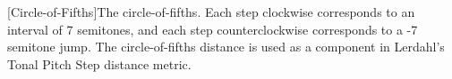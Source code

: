 [Circle-of-Fifths]The circle-of-fifths. Each step clockwise corresponds to an interval of 7 semitones, and each step counterclockwise corresponds to a -7 semitone jump. The circle-of-fifths distance is used as a component in Lerdahl's Tonal Pitch Step distance metric.